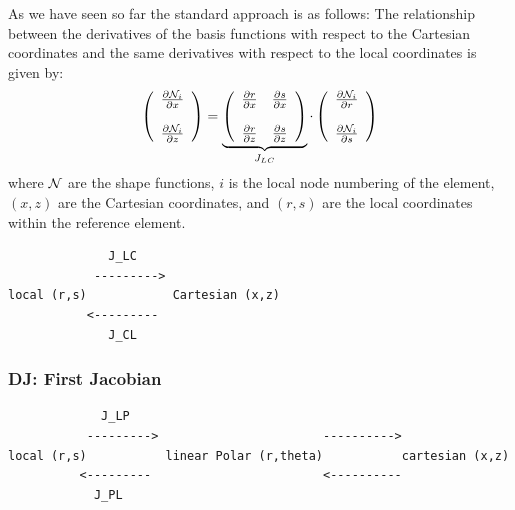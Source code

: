 As we have seen so far the standard approach is as follows:
The relationship between the derivatives of the basis functions with respect to the Cartesian coordinates and the same derivatives with respect to the local coordinates is given by:
\[
\left(
\begin{array}{c}
\frac{\partial {\mathcal{N}}_i}{\partial x} \\ \\
\frac{\partial {\mathcal{N}}_i}{\partial z} 
\end{array}
\right)
= 
\underbrace{\left(
\begin{array}{cc}
\frac{\partial r}{\partial x}  & 
\frac{\partial s}{\partial x}   \\ \\
\frac{\partial r}{\partial z}  & 
\frac{\partial s}{\partial z}  
\end{array}
\right)}_{J_{LC}}
\cdot
\left(
\begin{array}{c}
\frac{\partial {\mathcal{N}}_i}{\partial r} \\ \\
\frac{\partial {\mathcal{N}}_i}{\partial s} 
\end{array}
\right)
\]
where ${\mathcal{N}}$ are the shape functions, $i$ is the local node numbering of the element, $(x,z)$ are the Cartesian coordinates, and $(r,s)$ are the local coordinates within the reference element.


\begin{verbatim}
              J_LC
            --------->          
local (r,s)            Cartesian (x,z)
           <---------          
              J_CL
\end{verbatim}


\subsubsection{DJ: First Jacobian}


\begin{verbatim}
             J_LP
           --------->                       ---------->
local (r,s)           linear Polar (r,theta)           cartesian (x,z)
          <---------                        <----------
            J_PL
\end{verbatim}


